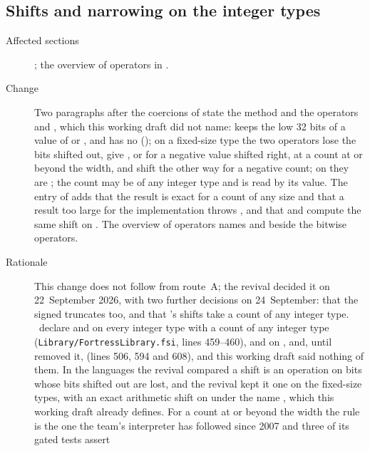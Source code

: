 \subsection{Shifts and narrowing on the integer types}

\begin{description}
\item[Affected sections] ; the overview of operators in
.
\item[Change] Two paragraphs after the coercions of  state
the method  and the operators  and , which this
working draft did not name:  keeps the low 32 bits of a value of
 or , and  has no 
(); on a fixed-size type the
two operators lose the bits shifted out, give , or  for a negative
value shifted right, at a count at or beyond the width, and shift the other way for
a negative count; on  they are ; the count may be of any
integer type and is read by its value.
The entry of  adds that the result is exact for a count of any size and
that a result too large for the implementation throws , and
that  and  compute the same shift on .
The overview of operators names  and  beside the bitwise
operators.
\item[Rationale] This change does not follow from route~A; the revival decided it on
22~September 2026, with two further decisions on 24~September: that the signed
 truncates too, and that 's shifts take a count of any
integer type.
\Library\ declare  and  on every integer type with a count of
any integer type (\nolinkurl{Library/FortressLibrary.fsi}, lines 459--460), and
 on ,  and, until
 removed it, 
(lines 506, 594 and 608), and this working draft said nothing of them.
In the languages the revival compared a shift is an operation on bits whose bits
shifted out are lost, and the revival kept it one on the fixed-size types, with an
exact arithmetic shift on  under the name , which this
working draft already defines.
For a count at or beyond the width the rule is the one the team's interpreter has
followed since 2007 and three of its gated tests assert

\end{description}
